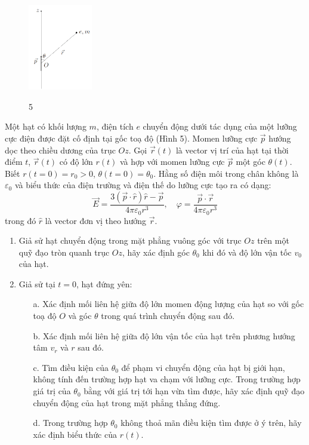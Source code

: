 \begin{figure}
  \centering
  \vspace{-30px}
  \includegraphics[width=0.25\textwidth]{images/Hinh 5.PNG}
  \begin{center}
    \figurename{ 5}
  \end{center}
\end{figure}

\vspace{-30px}
\noindent Một hạt có khối lượng $m$, điện tích $e$ chuyển động dưới tác dụng của một lưỡng cực điện được đặt cố định tại gốc toạ độ (Hình 5). Momen lưỡng cực $\vec{p}$ hướng dọc theo chiều dương của trục $Oz$. Gọi $\vec{r}(t)$ là vector vị trí của hạt tại thời điểm $t$, $\vec{r}(t)$ có độ lớn $r(t)$ và hợp với momen lưỡng cực $\vec{p}$ một góc $\theta(t)$. Biết $r(t=0)=r_{0}>0$, $\theta(t=0)=\theta_{0}$. Hằng số điện môi trong chân không là $\varepsilon_{0}$ và biểu thức của điện trường và điện thế do lưỡng cực tạo ra có dạng:
\begin{equation*}
  \vec{E}=\frac{3(\vec{p}\cdot\hat{r})\hat{r}-\vec{p}}{4\pi\varepsilon_{0}r^{3}},\quad\varphi=\frac{\vec{p}\cdot\vec{r}}{4\pi\varepsilon_{0}r^{3}}
\end{equation*}
trong đó $\hat{r}$ là vector đơn vị theo hướng $\vec{r}$.
\begin{enumerate}
  \item Giả sử hạt chuyển động trong mặt phẳng vuông góc với trục $Oz$ trên một quỹ đạo tròn quanh trục $Oz$, hãy xác định góc $\theta_{0}$ khi đó và độ lớn vận tốc $v_{0}$ của hạt.
  \item Giả sử tại $t=0$, hạt đứng yên:
        \begin{enumerate}
          \item[a.] Xác định mối liên hệ giữa độ lớn momen động lượng của hạt so với gốc toạ độ $O$ và góc $\theta$ trong quá trình chuyển động sau đó.
          \item[b.] Xác định mối liên hệ giữa độ lớn vận tốc của hạt trên phương hướng tâm $v_{r}$ và $r$ sau đó.
          \item[c.] Tìm điều kiện của $\theta_{0}$ để phạm vi chuyển động của hạt bị giới hạn, không tính đến trường hợp hạt va chạm với lưỡng cực. Trong trường hợp giá trị của $\theta_{0}$ bằng với giá trị tới hạn vừa tìm được, hãy xác định quỹ đạo chuyển động của hạt trong mặt phẳng thẳng đứng.
          \item[d.] Trong trường hợp $\theta_{0}$ không thoả mãn điều kiện tìm được ở ý trên, hãy xác định biểu thức của $r(t)$.
        \end{enumerate}
\end{enumerate}